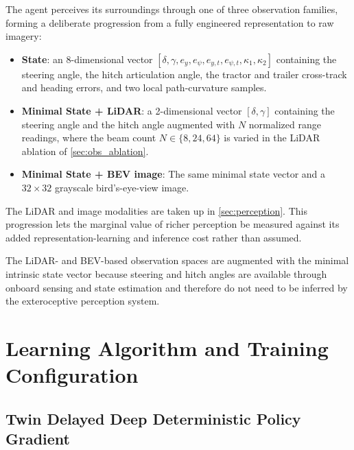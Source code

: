 The agent perceives its surroundings through one of three observation families, forming a deliberate progression from a fully engineered representation to raw imagery:
\begin{itemize}
    \item \textbf{State}: an 8-dimensional vector $[\delta,\gamma,e_y,e_\psi,e_{y,t},e_{\psi,t},\kappa_1,\kappa_2]$ containing the steering angle, the hitch articulation angle, the tractor and trailer cross-track and heading errors, and two local path-curvature samples.
    \item \textbf{Minimal State + LiDAR}: a 2-dimensional vector $[\delta,\gamma]$  containing the steering angle and the hitch angle augmented with $N$ normalized range readings, where the beam count $N \in \{8,24,64\}$ is varied in the LiDAR ablation of \cref{sec:obs_ablation}.
    \item \textbf{Minimal State + BEV image}: The same minimal state vector and a $32 \times 32$ grayscale bird's-eye-view image.
\end{itemize}
The LiDAR and image modalities are taken up in \cref{sec:perception}. This progression lets the marginal value of richer perception be measured against its added representation-learning and inference cost rather than assumed.

The LiDAR- and BEV-based observation spaces are augmented with the minimal intrinsic state vector because steering and hitch angles are available through onboard sensing and state estimation and therefore do not need to be inferred by the exteroceptive perception system.

\section{Learning Algorithm and Training Configuration}

\subsection{Twin Delayed Deep Deterministic Policy Gradient}
\label{sec:td3}

